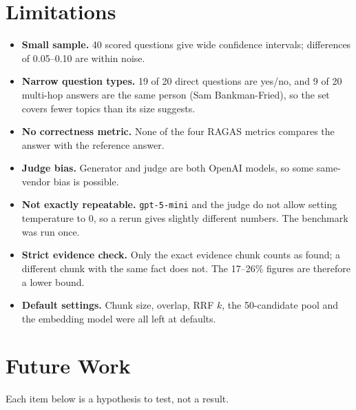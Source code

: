 \documentclass[10pt,twocolumn]{article}
\newcommand{\code}[1]{\texttt{\small #1}}
\begin{document}
\section{Limitations}
\begin{itemize}
\item \textbf{Small sample.} 40 scored questions give wide confidence intervals; differences of 0.05--0.10 are within noise.
\item \textbf{Narrow question types.} 19 of 20 direct questions are yes/no, and 9 of 20 multi-hop answers are the same person (Sam Bankman-Fried), so the set covers fewer topics than its size suggests.
\item \textbf{No correctness metric.} None of the four RAGAS metrics compares the answer with the reference answer.
\item \textbf{Judge bias.} Generator and judge are both OpenAI models, so some same-vendor bias is possible.
\item \textbf{Not exactly repeatable.} \code{gpt-5-mini} and the judge do not allow setting temperature to 0, so a rerun gives slightly different numbers. The benchmark was run once.
\item \textbf{Strict evidence check.} Only the exact evidence chunk counts as found; a different chunk with the same fact does not. The 17--26\% figures are therefore a lower bound.
\item \textbf{Default settings.} Chunk size, overlap, RRF $k$, the 50-candidate pool and the embedding model were all left at defaults.
\end{itemize}

\section{Future Work}
Each item below is a hypothesis to test, not a result.
\end{document}
